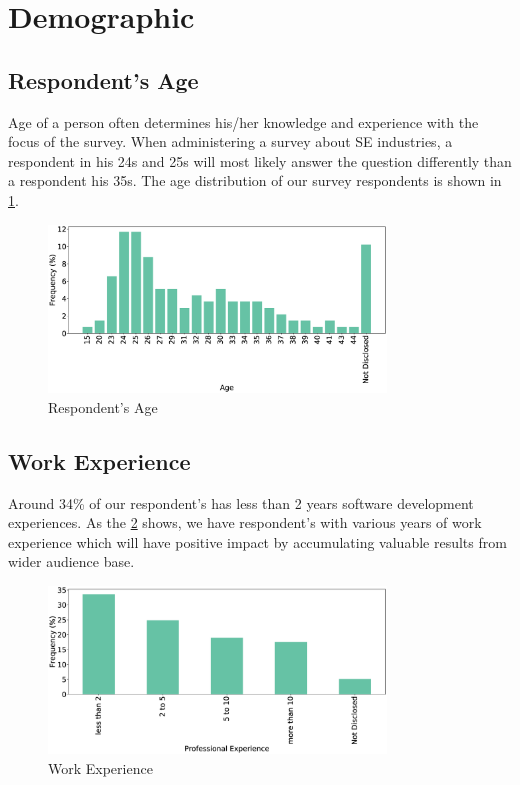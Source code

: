 \section{Demographic}
\label{demographic}

\subsection{Respondent's Age}
Age of a person often determines his/her knowledge and experience with the focus of the survey. When administering a survey about SE industries, a respondent in his 24s and 25s will most likely answer the question differently than a respondent his 35s. The age distribution of our survey respondents is shown in \cref{fig:age}.
\begin{figure}[H]
\centering
  \includegraphics[width=0.8\textwidth]{Figures/Respondents_Age}
  \caption{Respondent's Age}
  \label{fig:age}
\end{figure}

\subsection{Work Experience}
Around 34\% of our respondent's has less than 2 years software development experiences. As the \cref{fig:experience} shows, we have respondent's with various years of work experience which will have positive impact by accumulating valuable results from wider audience base.
\begin{figure}[H]
\centering
  \includegraphics[width=0.8\textwidth]{Figures/Respondents_Experience}
  \caption{Work Experience}
  \label{fig:experience}
\end{figure}

